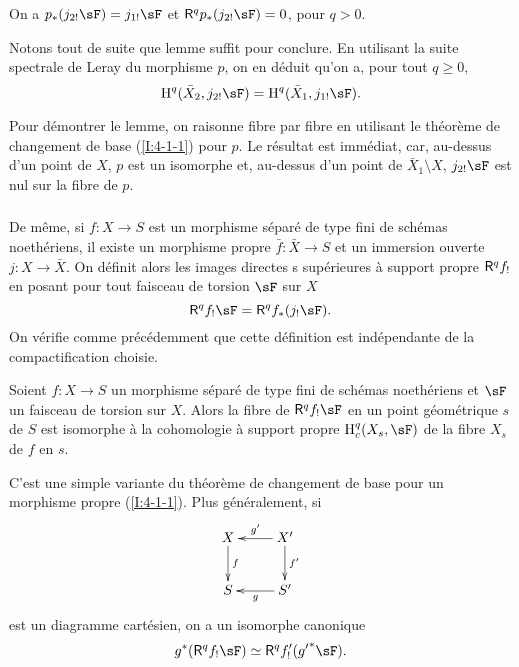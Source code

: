 \begin{lemma}\label{I:4-5-2}
On a $p_*(j_{2!} \sF) = j_{1!} \sF$ et $\R^q p_*(j_{2!} \sF) = 0$, pour $q>0$. 
\end{lemma}

Notons tout de suite que lemme suffit pour conclure. En utilisant la suite 
spectrale de Leray du morphisme $p$, on en déduit qu'on a, pour tout 
$q\geqslant 0$, 
\[
  \h^q(\bar X_2, j_{2!} \sF) = \h^q(\bar X_1, j_{1!} \sF) \text{.}
\]

Pour démontrer le lemme, on raisonne fibre par fibre en utilisant le théorème 
de changement de base (\ref{I:4-1-1}) pour $p$. Le résultat est immédiat, car, 
au-dessus d'un point de $X$, $p$ est un isomorphe et, au-dessus d'un point de 
$\bar X_1\setminus X$, $j_{2!} \sF$ est nul sur la fibre de $p$. 





\subsubsection{}\label{I:4-5-3}

De même, si $f:X\to S$ est un morphisme séparé de type fini de schémas 
noethériens, il existe un morphisme propre $\bar f:\bar X\to S$ et un 
immersion ouverte $j:X\to \bar X$. On définit alors les images directes s
supérieures à support propre $\mathsf{R}^q f_!$ en posant pour tout faisceau de 
torsion $\sF$ sur $X$
\[
  \R^q f_! \sF = \R^q f_*(j_! \sF) \text{.}
\]
On vérifie comme précédemment que cette définition est indépendante de 
la compactification choisie. 





\begin{theorem}\label{I:4-5-4}
Soient $f:X\to S$ un morphisme séparé de type fini de schémas noethériens 
et $\sF$ un faisceau de torsion sur $X$. Alors la fibre de $\R^q f_! \sF$ en un 
point géométrique $s$ de $S$ est isomorphe à la cohomologie à support 
propre $\h_c^q(X_s,\sF)$ de la fibre $X_s$ de $f$ en $s$. 
\end{theorem}

C'est une simple variante du théorème de changement de base pour un morphisme 
propre (\ref{I:4-1-1}). Plus généralement, si 
\[\xymatrix{
  X \ar[d]^-f
    & X' \ar[l]_-{g'} \ar[d]^-{f'} \\
  S 
    & S' \ar[l]^-g
}\]
est un diagramme cartésien, on a un isomorphe canonique 
\begin{equation}\label{I:eq:4-5-4-1}
  g^* (\R^q f_! \sF) \simeq \R^q f_!'({g'}^* \sF) \text{.}
\end{equation}










